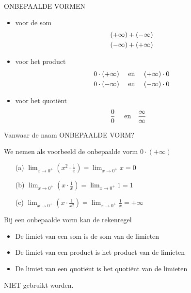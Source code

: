 \documentclass{beamer}
\begin{document}
\begin{frame}
\begin{alertblock}{ONBEPAALDE VORMEN}
\begin{itemize}
	\item voor de som
	\[\aligned
	& (+ \infty) + (-\infty) \\
& (- \infty) + (+ \infty) \\
\endaligned
\]
\item voor het product
\[\aligned
& 0 \cdot (+ \infty) \quad \text { en } \quad (+ \infty) \cdot 0 \\
& 0 \cdot (- \infty) \quad \text { en } \quad (- \infty) \cdot 0
\\
\endaligned
\]
\item voor het quoti\"ent
\[\aligned
& \frac{0}{0} \quad \text { en} \quad \frac{\infty}{\infty}
\endaligned
\]

\end{itemize}
\end{alertblock}
\end{frame}

\begin{frame}{Vanwaar de naam ONBEPAALDE VORM?}
\begin{exampleblock}{We nemen als voorbeeld de onbepaalde vorm $0 \cdot (+
\infty)$ }
\begin{itemize}
\item[(a)]
$\displaystyle{\lim_{x \to 0^+}} (x^2 \cdot \frac{1}{x}) =
\displaystyle{\lim_{x \to 0^+}} x = 0$ 
\item[(b)]
$\displaystyle{\lim_{x \to 0^+}} (x \cdot \frac{1}{x})=
\displaystyle{\lim_{x \to 0^+}} 1 = 1$ 
\item[(c)]
$\displaystyle{\lim_{x \to 0^+}} (x \cdot \frac{1}{x^2}) =
\displaystyle{\lim_{x \to 0^+}} \frac{1}{x} = + \infty$



\end{itemize}
\end{exampleblock}
\end{frame}

\begin{frame}
Bij een onbepaalde vorm kan de rekenregel
\begin{itemize}
	\item De limiet
van een som is de som van de limieten
\item De limiet van een product is
het product van de limieten
\item De limiet van een quoti\"ent is het
quoti\"ent van de limieten
\end{itemize}
NIET gebruikt worden.

\end{frame}
\end{document}
